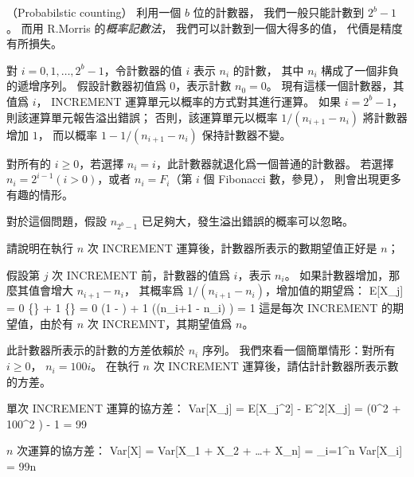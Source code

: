 \startsubject[
  title={Problems},
]

\startPROBLEM（Probabilstic counting）
利用一個 $b$ 位的計數器，
我們一般只能計數到 $2^b -1$。
而用 R.Morris 的\emph{概率記數法}，
我們可以計數到一個大得多的值，
代價是精度有所損失。

對 $i=0,1,\ldots,2^b-1$，令計數器的值 $i$ 表示 $n_i$ 的計數，
其中 $n_i$ 構成了一個非負的遞增序列。
假設計數器初值爲 $0$，表示計數 $n_0 = 0$。
現有這樣一個計數器，其值爲 $i$，
INCREMENT 運算單元以概率的方式對其進行運算。
如果 $i = 2^b-1$，則該運算單元報告溢出錯誤；
否則，該運算單元以概率 $1/(n_{i+1}-n_i)$ 將計數器增加 $1$，
而以概率 $1-1/(n_{i+1}-n_i)$ 保持計數器不變。

對所有的 $i\ge 0$，若選擇 $n_i = i$，此計數器就退化爲一個普通的計數器。
若選擇 $n_i=2^{i-1}(i>0)$，或者 $n_i=F_i$（第 $i$ 個 Fibonacci 數，參見\insection[notationfunction]），
則會出現更多有趣的情形。

對於這個問題，假設 $n_{2^b-1}$ 已足夠大，發生溢出錯誤的概率可以忽略。

\startigBase[a]
\startitem
請說明在執行 $n$ 次 INCREMENT 運算後，計數器所表示的數期望值正好是 $n$；
\stopitem
\stopigBase

\startANSWER
假設第 $j$ 次 INCREMENT 前，計數器的值爲 $i$，表示 $n_i$。
如果計數器增加，那麼其值會增大 $n_{i+1} - n_i$，
其概率爲 $1/(n_{i+1} - n_i)$，增加值的期望爲：
\startsplitformula\startmathalignment
\NC E[X_j] \NC= 0 \cdot \Pr\{\} + 1 \cdot \Pr\{\} \NR
\NC        \NC= 0 \cdot \left(1 - \right) +
                1 \cdot \left((n_{i+1} - n_i) \cdot {}\right) \NR
\NC        \NC= 1 \NR
\stopmathalignment\stopsplitformula
這是每次 INCREMENT 的期望值，由於有 $n$ 次 INCREMNT，其期望值爲 $n$。
\stopANSWER

\startigBase[continue]
\startitem
此計數器所表示的計數的方差依賴於 $n_i$ 序列。
我們來看一個簡單情形：對所有 $i\ge 0$， $n_i = 100i$。
在執行 $n$ 次 INCREMENT 運算後，請估計計數器所表示數的方差。
\stopitem
\stopigBase

\startANSWER
單次 INCREMENT 運算的協方差：
\startsplitformula\startmathalignment
\NC Var[X_j] \NC= E[X_j^2] - E^2[X_j] \NR
\NC           \NC= \left(0^2 \cdot {} + 100^2 \right) - 1 \NR
\NC           \NC= 99 \NR
\stopmathalignment\stopsplitformula

$n$ 次運算的協方差：
\startformula
Var[X] = Var[X_1 + X_2 + \ldots + X_n] = \sum_{i=1}^n Var[X_i] = 99n
\stopformula
\stopANSWER

